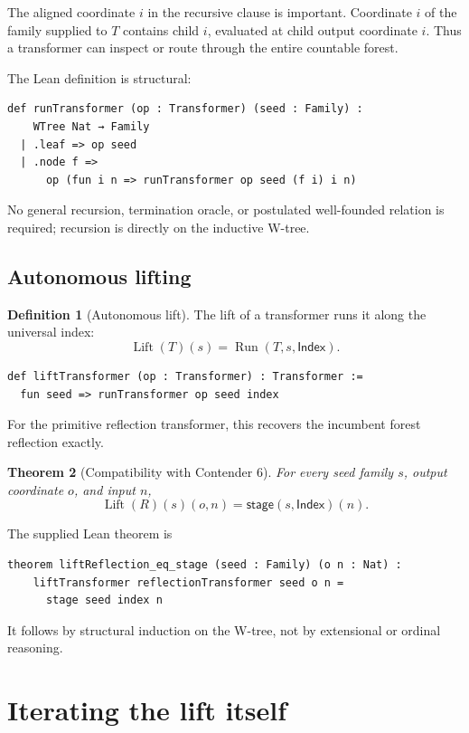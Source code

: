 \documentclass[11pt]{article}
\newtheorem{theorem}{Theorem}[section]
\theoremstyle{definition}
\newtheorem{definition}[theorem]{Definition}
\theoremstyle{remark}
\newcommand{\Run}{\operatorname{Run}}
\newcommand{\Lift}{\operatorname{Lift}}
\newcommand{\Index}{\mathsf{Index}}
\begin{document}
The aligned coordinate \(i\) in the recursive clause is important.  Coordinate
\(i\) of the family supplied to \(T\) contains child \(i\), evaluated at child
output coordinate \(i\).  Thus a transformer can inspect or route through the
entire countable forest.

The Lean definition is structural:
\begin{lstlisting}
def runTransformer (op : Transformer) (seed : Family) :
    WTree Nat → Family
  | .leaf => op seed
  | .node f =>
      op (fun i n => runTransformer op seed (f i) i n)
\end{lstlisting}
No general recursion, termination oracle, or postulated well-founded relation
is required; recursion is directly on the inductive W-tree.

\subsection{Autonomous lifting}

\begin{definition}[Autonomous lift]
The lift of a transformer runs it along the universal index:
\[
  \Lift(T)(s)=\Run(T,s,\Index).
\]
\end{definition}

\begin{lstlisting}
def liftTransformer (op : Transformer) : Transformer :=
  fun seed => runTransformer op seed index
\end{lstlisting}
For the primitive reflection transformer, this recovers the incumbent forest
reflection exactly.

\begin{theorem}[Compatibility with Contender 6]
For every seed family \(s\), output coordinate \(o\), and input \(n\),
\[
 \Lift(R)(s)(o,n)=\mathsf{stage}(s,\Index)(n).
\]
\end{theorem}

The supplied Lean theorem is
\begin{lstlisting}
theorem liftReflection_eq_stage (seed : Family) (o n : Nat) :
    liftTransformer reflectionTransformer seed o n =
      stage seed index n
\end{lstlisting}
It follows by structural induction on the W-tree, not by extensional or
ordinal reasoning.

\section{Iterating the lift itself}
\label{sec:operator-stage}
\end{document}

